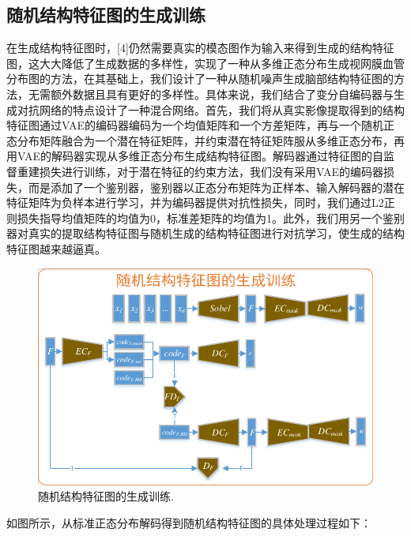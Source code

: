 \documentclass[letterpaper]{article} %
\begin{document}
\subsection{随机结构特征图的生成训练}
在生成结构特征图时，[4]仍然需要真实的模态图作为输入来得到生成的结构特征图，这大大降低了生成数据的多样性，\cite{41costa2017towards}实现了一种从多维正态分布生成视网膜血管分布图的方法，在其基础上，我们设计了一种从随机噪声生成脑部结构特征图的方法，无需额外数据且具有更好的多样性。具体来说，我们结合了变分自编码器与生成对抗网络的特点设计了一种混合网络。首先，我们将从真实影像提取得到的结构特征图通过VAE的编码器编码为一个均值矩阵和一个方差矩阵，再与一个随机正态分布矩阵融合为一个潜在特征矩阵，并约束潜在特征矩阵服从多维正态分布，再用VAE的解码器实现从多维正态分布生成结构特征图。解码器通过特征图的自监督重建损失进行训练，对于潜在特征的约束方法，我们没有采用VAE的编码器损失，而是添加了一个鉴别器，鉴别器以正态分布矩阵为正样本、输入解码器的潜在特征矩阵为负样本进行学习，并为编码器提供对抗性损失，同时，我们通过L2正则损失指导均值矩阵的均值为0，标准差矩阵的均值为1。此外，我们用另一个鉴别器对真实的提取结构特征图与随机生成的结构特征图进行对抗学习，使生成的结构特征图越来越逼真。
\begin{figure}
	\centering
	\includegraphics[width=0.98\linewidth]{figures/feature_train}
	\caption{随机结构特征图的生成训练.}
	\label{feature_train}
\end{figure}
如图所示，从标准正态分布解码得到随机结构特征图的具体处理过程如下：
\end{document}

